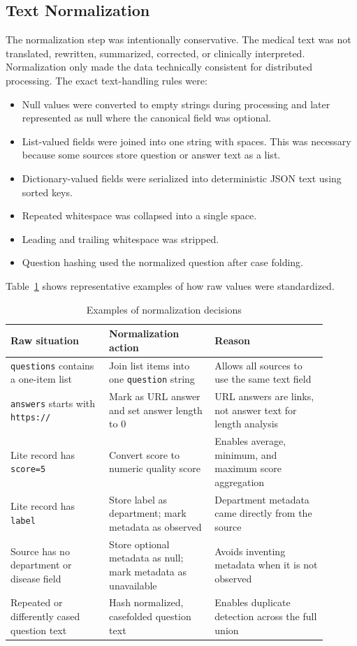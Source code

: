 \documentclass[12pt,a4paper]{article}
\begin{document}
\subsection{Text Normalization}

The normalization step was intentionally conservative. The medical text was not translated, rewritten, summarized, corrected, or clinically interpreted. Normalization only made the data technically consistent for distributed processing. The exact text-handling rules were:

\begin{itemize}
\item Null values were converted to empty strings during processing and later represented as null where the canonical field was optional.
\item List-valued fields were joined into one string with spaces. This was necessary because some sources store question or answer text as a list.
\item Dictionary-valued fields were serialized into deterministic JSON text using sorted keys.
\item Repeated whitespace was collapsed into a single space.
\item Leading and trailing whitespace was stripped.
\item Question hashing used the normalized question after case folding.
\end{itemize}

Table~\ref{tab:normalization-examples} shows representative examples of how raw values were standardized.

\begin{table}[H]
\centering
\small
\caption{Examples of normalization decisions}
\label{tab:normalization-examples}
\begin{tabular}{p{0.28\linewidth}p{0.30\linewidth}p{0.32\linewidth}}
\toprule
Raw situation & Normalization action & Reason \\
\midrule
\texttt{questions} contains a one-item list & Join list items into one \texttt{question} string & Allows all sources to use the same text field \\
\texttt{answers} starts with \texttt{https://} & Mark as URL answer and set answer length to 0 & URL answers are links, not answer text for length analysis \\
Lite record has \texttt{score=5} & Convert score to numeric quality score & Enables average, minimum, and maximum score aggregation \\
Lite record has \texttt{label} & Store label as department; mark metadata as observed & Department metadata came directly from the source \\
Source has no department or disease field & Store optional metadata as null; mark metadata as unavailable & Avoids inventing metadata when it is not observed \\
Repeated or differently cased question text & Hash normalized, casefolded question text & Enables duplicate detection across the full union \\
\bottomrule
\end{tabular}
\end{table}
\end{document}

